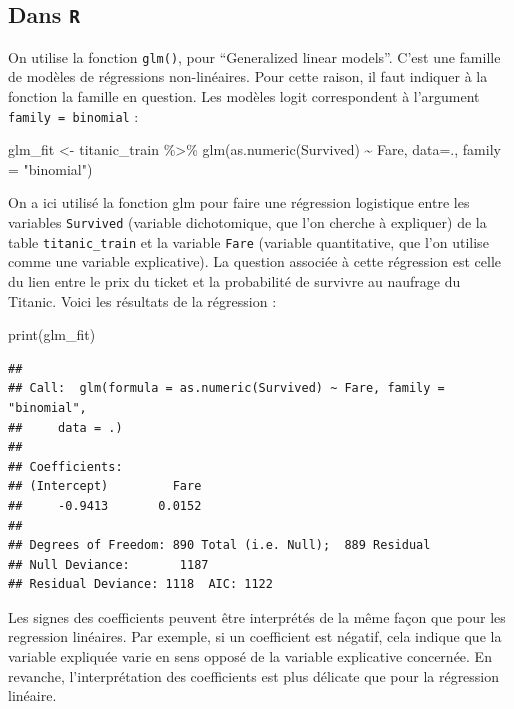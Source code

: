 \documentclass[
  french,
]{book}
\newenvironment{Shaded}{\begin{snugshade}}{\end{snugshade}}
\newcommand{\AttributeTok}[1]{\textcolor[rgb]{0.77,0.63,0.00}{#1}}
\newcommand{\FunctionTok}[1]{\textcolor[rgb]{0.00,0.00,0.00}{#1}}
\newcommand{\NormalTok}[1]{#1}
\newcommand{\OtherTok}[1]{\textcolor[rgb]{0.56,0.35,0.01}{#1}}
\newcommand{\SpecialCharTok}[1]{\textcolor[rgb]{0.00,0.00,0.00}{#1}}
\newcommand{\StringTok}[1]{\textcolor[rgb]{0.31,0.60,0.02}{#1}}
\begin{document}
\hypertarget{dans-r}{%
\subsection{\texorpdfstring{Dans \texttt{R}}{Dans R}}\label{dans-r}}

On utilise la fonction \texttt{glm()}, pour ``Generalized linear models''. C'est une famille de modèles de régressions non-linéaires. Pour cette raison, il faut indiquer à la fonction la famille en question. Les modèles logit correspondent à l'argument \texttt{family\ =\ binomial} :

\begin{Shaded}
\begin{Highlighting}[]
\NormalTok{glm\_fit }\OtherTok{\textless{}{-}}\NormalTok{ titanic\_train }\SpecialCharTok{\%\textgreater{}\%}
  \FunctionTok{glm}\NormalTok{(}\FunctionTok{as.numeric}\NormalTok{(Survived) }\SpecialCharTok{\textasciitilde{}}\NormalTok{ Fare,}
      \AttributeTok{data=}\NormalTok{., }
      \AttributeTok{family =} \StringTok{"binomial"}\NormalTok{)}
\end{Highlighting}
\end{Shaded}

On a ici utilisé la fonction glm pour faire une régression logistique entre les variables \texttt{Survived} (variable dichotomique, que l'on cherche à expliquer) de la table \texttt{titanic\_train} et la variable \texttt{Fare} (variable quantitative, que l'on utilise comme une variable explicative). La question associée à cette régression est celle du lien entre le prix du ticket et la probabilité de survivre au naufrage du Titanic. Voici les résultats de la régression :

\begin{Shaded}
\begin{Highlighting}[]
\FunctionTok{print}\NormalTok{(glm\_fit)}
\end{Highlighting}
\end{Shaded}

\begin{verbatim}
## 
## Call:  glm(formula = as.numeric(Survived) ~ Fare, family = "binomial", 
##     data = .)
## 
## Coefficients:
## (Intercept)         Fare  
##     -0.9413       0.0152  
## 
## Degrees of Freedom: 890 Total (i.e. Null);  889 Residual
## Null Deviance:       1187 
## Residual Deviance: 1118  AIC: 1122
\end{verbatim}

Les signes des coefficients peuvent être interprétés de la même façon que pour les regression linéaires. Par exemple, si un coefficient est négatif, cela indique que la variable expliquée varie en sens opposé de la variable explicative concernée. En revanche, l'interprétation des coefficients est plus délicate que pour la régression linéaire.
\end{document}
